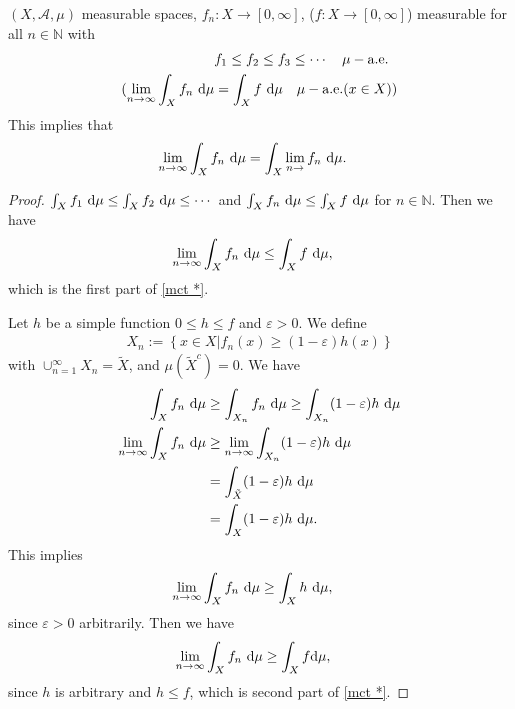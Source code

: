 \documentclass[../../note.tex]{subfiles}
\begin{document}
\begin{theorem}
    \label{thm: monotone convergence theorem}
    $(X, \mathcal{A}, \mu)$ measurable spaces, $f_n: X \rightarrow [0,\infty]$, ($f: X \rightarrow [0,\infty]$) measurable for all $n \in \mathbb{N}$ with
    \begin{align}
        &f_1 \leq f_2 \leq f_3 \leq \cdots~~~\mu-\mbox{a.e.}\\  
        (\lim_{n \rightarrow \infty} \int_X f_n~{\rm d}\mu
        &= \int_X f~{\rm d}\mu~~~\mu-\mbox{a.e.}(x \in X))
    \end{align}
    This implies that
    \begin{align}
        \lim_{n \rightarrow \infty} \int_X f_n~{\rm d}\mu 
        &= \int_X \lim_{n \rightarrow} f_n~{\rm d}\mu.
        \label{mct *}
    \end{align}
\end{theorem}
\begin{proof}
    $\int_X f_1~{\rm d}\mu \leq \int_X f_2~{\rm d}\mu \leq \cdots$ and $\int_X f_n~{\rm d}\mu \leq \int_X f~{\rm d}\mu$ for $n \in \mathbb{N}$. Then we have
    \begin{align}
        \lim_{n \rightarrow \infty} \int_X f_n~{\rm d}\mu 
        &\leq \int_X f~{\rm d}\mu,
    \end{align}
    which is the first part of \ref{mct *}.

    Let $h$ be a simple function $0 \leq h \leq f$ and $\varepsilon > 0$. We define 
    \begin{align}
        X_n:= \left\{x\in X \vert f_n(x) \geq (1-\varepsilon)h(x) \right\}
    \end{align}
    with $\cup_{n=1}^{\infty} X_n = \tilde{X}$, and $\mu(\tilde{X}^c) = 0$. We have
    \begin{align}
        \int_X f_n~{\rm d}\mu 
        &\geq \int_{X_n} f_n~{\rm d}\mu \geq \int_{X_n} (1-\varepsilon)h~{\rm d}\mu \\
        \lim_{n \rightarrow \infty} \int_X f_n~{\rm d}\mu
        &\geq \lim_{n \rightarrow \infty} \int_{X_n} (1-\varepsilon)h~{\rm d}\mu \\
        &= \int_{\tilde{X}} (1-\varepsilon)h~{\rm d}\mu \\
        &= \int_X (1-\varepsilon)h~{\rm d}\mu.
    \end{align}
    This implies
    \begin{align}
        \lim_{n \rightarrow \infty} \int_X f_n~{\rm d}\mu 
        &\geq \int_X h~{\rm d}\mu,
    \end{align}
    since $\varepsilon > 0$ arbitrarily. Then we have
    \begin{align}
        \lim_{n \rightarrow \infty} \int_X f_n~{\rm d}\mu 
        &\geq \int_X f{\rm d}\mu,
    \end{align}
    since $h$ is arbitrary and $h \leq f$, which is second part of \ref{mct *}.
\end{proof}
\end{document}
